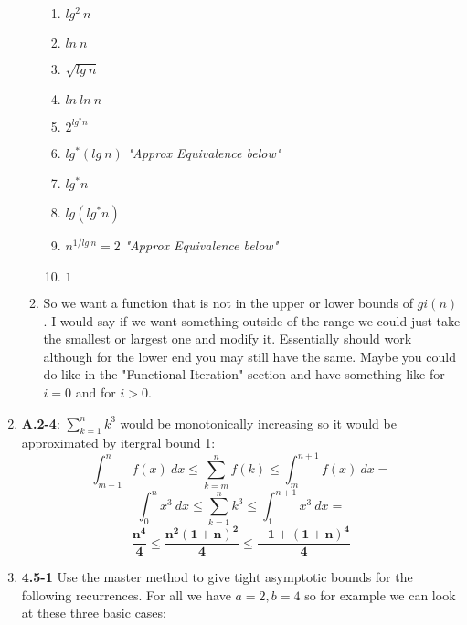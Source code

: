 \documentclass{article}
\begin{document}
\begin{enumerate}
\begin{enumerate}
\begin{enumerate}
        \item $lg^2\:n$
        \item $ln\:n$
        \item $\sqrt{lg\:n}$
        \item $ln\:ln\:n$
        \item $2^{lg^{*}n}$
        \item $lg^*(lg\:n)$ \textit{"Approx Equivalence below"}
        \item $lg^*n$
        \item $lg(lg^{*}n)$
        \item $n^{1/lg\:n} = 2$ \textit{"Approx Equivalence below"}
        \item $1$        
      \end{enumerate}
      \item So we want a function that is not in the upper or lower bounds of $gi(n)$. 
      I would say if we want something outside of the range we could just take the smallest or largest one and modify it. 
      Essentially  should work although for the lower end you may still have the same. 
      Maybe you could do like in the "Functional Iteration" section and have something like  for $i = 0$ and  for $i > 0$.
    \end{enumerate}

    \item \textbf{A.2-4}: $\sum_{k=1}^{n} k^3$ would be monotonically increasing so it would be approximated by itergral bound 1:
    \[ \int_{m-1}^{n} f(x)\:dx \leq \sum_{k=m}^{n} f(k) \leq \int_{m}^{n+1} f(x)\:dx = \]
    \[ \int_{0}^{n} x^3\:dx \leq \sum_{k=1}^{n} k^3 \leq \int_{1}^{n+1} x^3\:dx = \]
    \[\bm{ \frac{n^4}{4} \leq \frac{n^2 (1 + n)^2}{4} \leq \frac{-1 + (1 + n)^4}{4} }\]
    
    \item \textbf{4.5-1} Use the master method to give tight asymptotic bounds for the following recurrences. For all we have $a = 2, b = 4$ so for example we can look at these three basic cases:


\end{enumerate}
\end{document}
